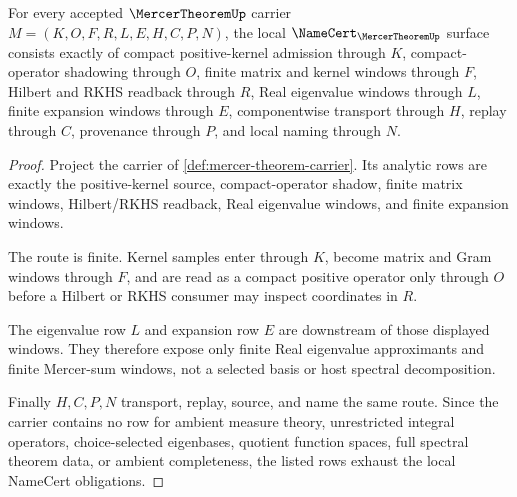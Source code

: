 \begin{theorem}
\label{thm:mercer-theorem-namecert-obligations}
For every accepted $\MercerTheoremUp$ carrier $M=(K,O,F,R,L,E,H,C,P,N)$, the local $\NameCert_{\MercerTheoremUp}$ surface consists exactly of compact positive-kernel admission through $K$, compact-operator shadowing through $O$, finite matrix and kernel windows through $F$, Hilbert and RKHS readback through $R$, Real eigenvalue windows through $L$, finite expansion windows through $E$, componentwise transport through $H$, replay through $C$, provenance through $P$, and local naming through $N$.
\end{theorem}
\begin{proof}
Project the carrier of \autoref{def:mercer-theorem-carrier}. Its analytic rows are exactly the positive-kernel source, compact-operator shadow, finite matrix windows, Hilbert/RKHS readback, Real eigenvalue windows, and finite expansion windows.

The route is finite. Kernel samples enter through $K$, become matrix and Gram windows through $F$, and are read as a compact positive operator only through $O$ before a Hilbert or RKHS consumer may inspect coordinates in $R$.

The eigenvalue row $L$ and expansion row $E$ are downstream of those displayed windows. They therefore expose only finite Real eigenvalue approximants and finite Mercer-sum windows, not a selected basis or host spectral decomposition.

Finally $H,C,P,N$ transport, replay, source, and name the same route. Since the carrier contains no row for ambient measure theory, unrestricted integral operators, choice-selected eigenbases, quotient function spaces, full spectral theorem data, or ambient completeness, the listed rows exhaust the local NameCert obligations.
\end{proof}

